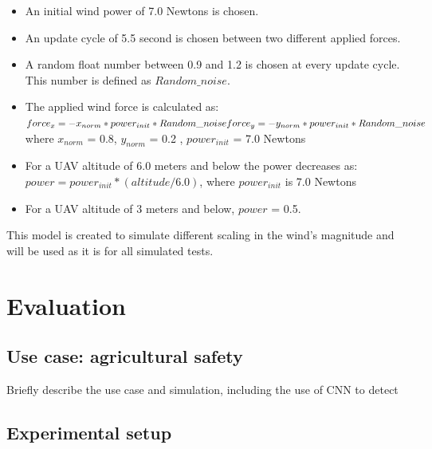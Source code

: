 \documentclass[conference]{IEEEtran}
\begin{document}
\begin{itemize}
    \item An initial wind power of 7.0 Newtons is chosen.
    
    \item An update cycle of 5.5 second is chosen between two different applied forces.
    
    \item A random float number between 0.9 and 1.2 is chosen at every update cycle. This number is defined as \(Random\_noise\).
    
    \item The applied wind force is calculated as:\\
    
  
    
        \(force_{x} = -x_{norm} * power_{init} * Random\_noise \\
         force_{y} = -y_{norm} * power_{init} * Random\_noise\)\\
        

    where \(x_{norm }\) = 0.8, \(y_{norm} \) = 0.2 , \(power_{init}\) = 7.0 Newtons
    
    \item For a UAV altitude of 6.0 meters and below the power decreases as:
   \( power = power_{init}* (altitude/ 6.0)  \), where \(power_{init}\) is 7.0 Newtons
   
   \item For a UAV altitude of 3 meters and below, \(power\) = 0.5. 

    
\end{itemize}

This model is created to simulate different scaling in the wind's magnitude and will be used as it is for all simulated tests.

\section{Evaluation}
\label{sec:experimental}

\subsection{Use case: agricultural safety}

Briefly describe the use case and simulation, including the use of CNN
to detect

\subsection{Experimental setup}
\end{document}
